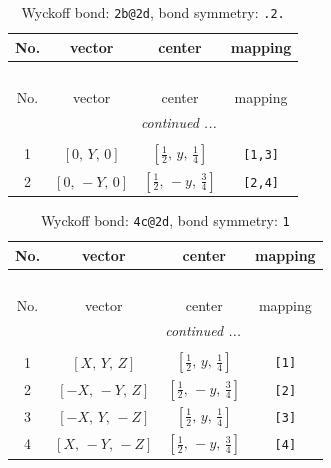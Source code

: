 \documentclass[fleqn,8pt]{jsarticle}
\begin{document}
\renewcommand{\arraystretch}{1.2}
\begin{longtable}{cccc}
\caption{Wyckoff bond: {\tt 2b@2d}, bond symmetry: {\tt .2.}}
 \\
 \hline \hline
No. & vector & center & mapping \\ \hline \endfirsthead

\multicolumn{3}{l}{\tablename\ \thetable{}} \\
 \hline \hline
No. & vector & center & mapping \\ \hline \endhead

 \hline \hline
\multicolumn{3}{r}{\footnotesize\it continued ...} \\ \endfoot

 \hline \hline
\multicolumn{3}{r}{} \\ \endlastfoot

1 & $\left[ 0,\, Y,\, 0 \right]$ & $\left[ \frac{1}{2},\, y,\, \frac{1}{4} \right]$ & {\tt [1,3]} \\ \hline
2 & $\left[ 0,\, - Y,\, 0 \right]$ & $\left[ \frac{1}{2},\, - y,\, \frac{3}{4} \right]$ & {\tt [2,4]} \\
\end{longtable}
\renewcommand{\arraystretch}{1.2}
\begin{longtable}{cccc}
\caption{Wyckoff bond: {\tt 4c@2d}, bond symmetry: {\tt 1}}
 \\
 \hline \hline
No. & vector & center & mapping \\ \hline \endfirsthead

\multicolumn{3}{l}{\tablename\ \thetable{}} \\
 \hline \hline
No. & vector & center & mapping \\ \hline \endhead

 \hline \hline
\multicolumn{3}{r}{\footnotesize\it continued ...} \\ \endfoot

 \hline \hline
\multicolumn{3}{r}{} \\ \endlastfoot

1 & $\left[ X,\, Y,\, Z \right]$ & $\left[ \frac{1}{2},\, y,\, \frac{1}{4} \right]$ & {\tt [1]} \\ \hline
2 & $\left[ - X,\, - Y,\, Z \right]$ & $\left[ \frac{1}{2},\, - y,\, \frac{3}{4} \right]$ & {\tt [2]} \\ \hline
3 & $\left[ - X,\, Y,\, - Z \right]$ & $\left[ \frac{1}{2},\, y,\, \frac{1}{4} \right]$ & {\tt [3]} \\ \hline
4 & $\left[ X,\, - Y,\, - Z \right]$ & $\left[ \frac{1}{2},\, - y,\, \frac{3}{4} \right]$ & {\tt [4]} \\
\end{longtable}
\end{document}
